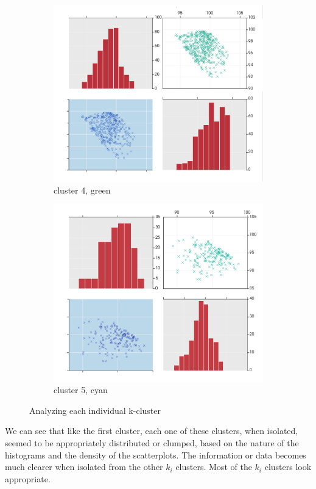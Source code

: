 \documentclass[12pt]{article}
\numberwithin{equation}{subsection}
\begin{document}
\begin{figure}[H]
\begin{subfigure}[b]{0.5\linewidth}
    \centering
    \includegraphics[width=0.9\linewidth]{cluster4} 
    \caption{cluster 4, green} 
    \label{fig5:c} 
  \end{subfigure}%
  \begin{subfigure}[b]{0.5\linewidth}
    \centering
    \includegraphics[width=0.9\linewidth]{cluster5} 
    \caption{cluster 5, cyan} 
    \label{fig5:d} 
  \end{subfigure} 
  \caption{Analyzing each individual k-cluster}
  \label{fig5} 
\end{figure}

We can see that like the first cluster, each one of these clusters, when isolated, seemed to be appropriately distributed or clumped, based on the nature of the histograms and the density of the scatterplots. The information or data becomes much clearer when isolated from the other $k_i$ clusters. Most of the $k_i$ clusters look appropriate.
\end{document}
